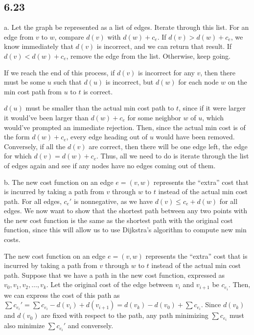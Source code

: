 \documentclass{article}
\begin{document}
\subsection*{6.23}
a. Let the graph be represented as a list of edges. Iterate through this list. For an edge from $v$ to $w$, compare $d(v)$ with $d(w)+c_e$. If $d(v)>d(w)+c_e$, we know immediately that $d(v)$ is incorrect, and we can return that result. If $d(v)<d(w)+c_e$, remove the edge from the list. Otherwise, keep going. 

If we reach the end of this process, if $d(v)$ is incorrect for any $v$, then there must be some $u$ such that $d(u)$ is incorrect, but $d(w)$ for each node $w$ on the min cost path from $u$ to $t$ is correct. 

$d(u)$ must be smaller than the actual min cost path to $t$, since if it were larger it would've been larger than $d(w)+c_e$ for some neighbor $w$ of $u$, which would've prompted an immediate rejection. Then, since the actual min cost is of the form $d(w)+c_e$, every edge heading out of $u$ would have been removed. Conversely, if all the $d(v)$ are correct, then there will be one edge left, the edge for which $d(v)=d(w)+c_e$. Thus, all we need to do is iterate through the list of edges again and see if any nodes have no edges coming out of them. 

\noindent b. The new cost function on an edge $e=(v,w)$ represents the ``extra'' cost that is incurred by taking a path from $v$ through $w$ to $t$ instead of the actual min cost path. For all edges, $c_e'$ is nonnegative, as we have $d(v)\leq c_e+d(w)$ for all edges. We now want to show that the shortest path between any two points with the new cost function is the same as the shortest path with the original cost function, since this will allow us to use Dijkstra's algorithm to compute new min costs.

The new cost function on an edge $e=(v,w)$ represents the ``extra'' cost that is incurred by taking a path from $v$ through $w$ to $t$ instead of the actual min cost path. Suppose that we have a path in the new cost function, expressed as $v_0,v_1,v_2,\ldots,v_k$. Let the original cost of the edge between $v_i$ and $v_{i+1}$ be $c_{e_i}$. Then, we can express the cost of this path as $\sum c_{e_i}'=\sum c_{e_i}-d(v_i)+d(v_{i+1})=d(v_k)-d(v_0)+\sum c_{e_i}$. Since $d(v_k)$ and $d(v_0)$ are fixed with respect to the path, any path minimizing $\sum c_{e_i}$ must also minimize $\sum c_{e_i}'$ and conversely.
\end{document}
